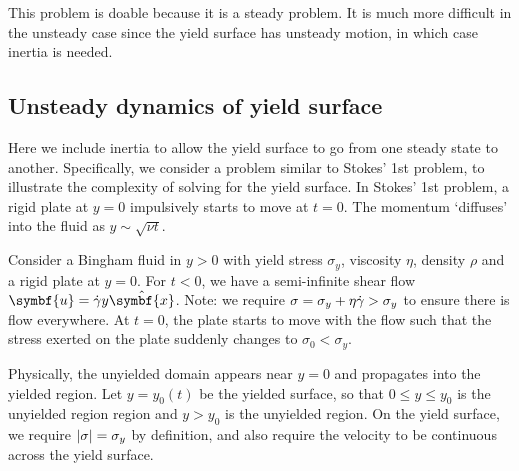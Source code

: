 \documentclass{jknotes}
\begin{document}
This problem is doable because it is a steady problem. It is much more
difficult in the unsteady case since the yield surface has unsteady motion, in
which case inertia is needed.

\subsection{Unsteady dynamics of yield surface}
Here we include inertia to allow the yield surface to go from one steady state
to another. Specifically, we consider a problem similar to Stokes' 1st
problem, to illustrate the complexity of solving for the yield surface. In
Stokes' 1st problem, a rigid plate at $y=0$ impulsively starts to move at
$t=0$. The momentum `diffuses' into the fluid as $y \sim \sqrt{\nu t}$.

Consider a Bingham fluid in $y > 0$ with yield stress $\sigma_y$, viscosity
$\eta$, density $\rho$ and a rigid plate at $y=0$. For $t < 0$, we have a
semi-infinite shear flow $\symbf{u} = \srate y \hat{\symbf{x}}$. Note: we require
$\sigma = \sigma_y + \eta \dot{\gamma} > \sigma_y$ to ensure there is flow everywhere. At
$t=0$, the plate starts to move with the flow such that the stress exerted on
the plate suddenly changes to $\sigma_0 < \sigma_y$. 

\begin{center}
\end{center}

Physically, the unyielded domain appears near $y=0$ and propagates into the
yielded region. Let $y=y_0(t)$ be the yielded surface, so that $0 \le y \le
y_0$ is the unyielded region region and $y > y_0$ is the unyielded region. On
the yield surface, we require $\abs{\sigma} = \sigma_y$ by definition, and
also require the velocity to be continuous across the yield surface.
\end{document}
